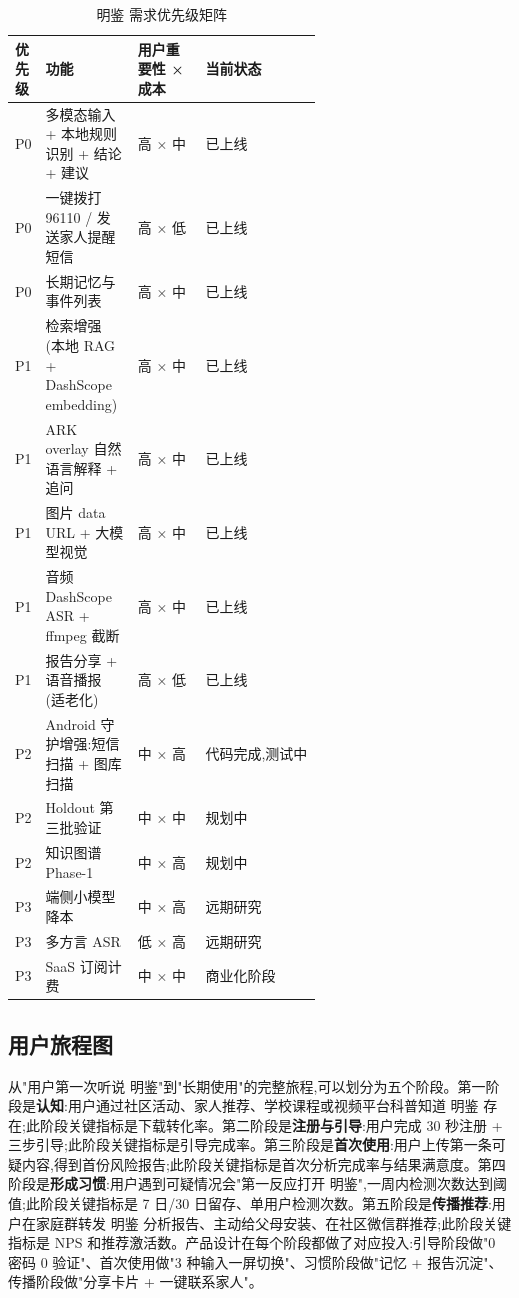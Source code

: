 \documentclass[UTF8,a4paper,12pt]{ctexart}
\begin{document}
\begin{table}[!htbp]
    \centering
    \caption{明鉴 需求优先级矩阵}
    \label{tab:priority-matrix}
    \renewcommand{\arraystretch}{1.4}
    \footnotesize
    \begin{tabularx}{\linewidth}{p{0.09\linewidth}p{0.30\linewidth}p{0.22\linewidth}Y}
        \toprule
        优先级 & 功能 & 用户重要性 × 成本 & 当前状态 \\
        \midrule
        P0 & 多模态输入 + 本地规则识别 + 结论 + 建议 & 高 × 中 & 已上线 \\
        P0 & 一键拨打 96110 / 发送家人提醒短信 & 高 × 低 & 已上线 \\
        P0 & 长期记忆与事件列表 & 高 × 中 & 已上线 \\
        P1 & 检索增强 (本地 RAG + DashScope embedding) & 高 × 中 & 已上线 \\
        P1 & ARK overlay 自然语言解释 + 追问 & 高 × 中 & 已上线 \\
        P1 & 图片 data URL + 大模型视觉 & 高 × 中 & 已上线 \\
        P1 & 音频 DashScope ASR + ffmpeg 截断 & 高 × 中 & 已上线 \\
        P1 & 报告分享 + 语音播报 (适老化) & 高 × 低 & 已上线 \\
        P2 & Android 守护增强:短信扫描 + 图库扫描 & 中 × 高 & 代码完成,测试中 \\
        P2 & Holdout 第三批验证 & 中 × 中 & 规划中 \\
        P2 & 知识图谱 Phase-1 & 中 × 高 & 规划中 \\
        P3 & 端侧小模型降本 & 中 × 高 & 远期研究 \\
        P3 & 多方言 ASR & 低 × 高 & 远期研究 \\
        P3 & SaaS 订阅计费 & 中 × 中 & 商业化阶段 \\
        \bottomrule
    \end{tabularx}
\end{table}

\subsection{用户旅程图}

从"用户第一次听说 明鉴"到"长期使用"的完整旅程,可以划分为五个阶段。第一阶段是\textbf{认知}:用户通过社区活动、家人推荐、学校课程或视频平台科普知道 明鉴 存在;此阶段关键指标是下载转化率。第二阶段是\textbf{注册与引导}:用户完成 30 秒注册 + 三步引导;此阶段关键指标是引导完成率。第三阶段是\textbf{首次使用}:用户上传第一条可疑内容,得到首份风险报告;此阶段关键指标是首次分析完成率与结果满意度。第四阶段是\textbf{形成习惯}:用户遇到可疑情况会"第一反应打开 明鉴",一周内检测次数达到阈值;此阶段关键指标是 7 日/30 日留存、单用户检测次数。第五阶段是\textbf{传播推荐}:用户在家庭群转发 明鉴 分析报告、主动给父母安装、在社区微信群推荐;此阶段关键指标是 NPS 和推荐激活数。产品设计在每个阶段都做了对应投入:引导阶段做"0 密码 0 验证"、首次使用做"3 种输入一屏切换"、习惯阶段做"记忆 + 报告沉淀"、传播阶段做"分享卡片 + 一键联系家人"。
\end{document}
